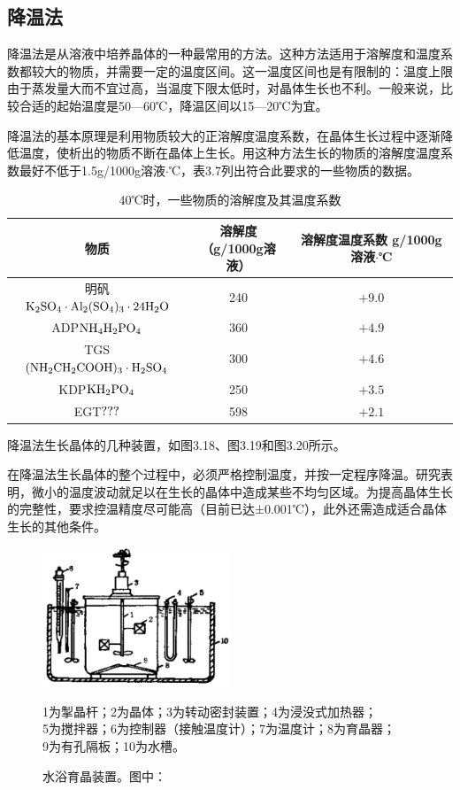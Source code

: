 ﻿\subsection{降温法}
降温法是从溶液中培养晶体的一种最常用的方法。这种方法适用于溶解度和温度系数都较大的物质，并需要一定的温度区间。这一温度区间也是有限制的：温度上限由于蒸发量大而不宜过高，当温度下限太低时，对晶体生长也不利。一般来说，比较合适的起始温度是50---60℃，降温区间以15---20℃为宜。

降温法的基本原理是利用物质较大的正溶解度温度系数，在晶体生长过程中逐渐降低温度，使析出的物质不断在晶体上生长。用这种方法生长的物质的溶解度温度系数最好不低于1.5g/1000g溶液$\cdot$℃，表3.7列出符合此要求的一些物质的数据。

\begin{table}[h]
\centering
\caption{40℃时，一些物质的溶解度及其温度系数}
\begin{tabular}{c|c|c}\toprule
物质 & \tabincell{c}{溶解度\\（g/1000g溶液）} & \tabincell{c}{溶解度温度系数\\g/1000g溶液$\cdot$℃}\\\hline
明矾\quad$\rm K_2SO_4\cdot Al_2(SO_4)_3\cdot 24H_2O$ & 240 & $+9.0$\\
ADP\quad$\rm NH_4H_2PO_4$ & 360 & $+4.9$\\
TGS\quad$\rm (NH_2CH_2COOH)_3\cdot H_2SO_4$ & 300 & $+4.6$\\
KDP\quad$\rm KH_2PO_4$ & 250 & $+3.5$\\
EGT\quad$\rm ???$ & 598 & $+2.1$\\
\bottomrule
\end{tabular}
\end{table}

降温法生长晶体的几种装置，如图3.18、图3.19和图3.20所示。

在降温法生长晶体的整个过程中，必须严格控制温度，并按一定程序降温。研究表明，微小的温度波动就足以在生长的晶体中造成某些不均匀区域。为提高晶体生长的完整性，要求控温精度尽可能高（目前已达±0.001℃），此外还需造成适合晶体生长的其他条件。

\begin{figure}[h]
 \centering
 \includegraphics[width=0.5\textwidth]{fig/cp03/img3.18.jpg}
 \caption{水浴育晶装置。图中：}
 1为掣晶杆；2为晶体；3为转动密封装置；4为浸没式加热器； \\
 5为搅拌器；6为控制器（接触温度计）；7为温度计；8为育晶器；\\
 9为有孔隔板；10为水槽。
\end{figure}


